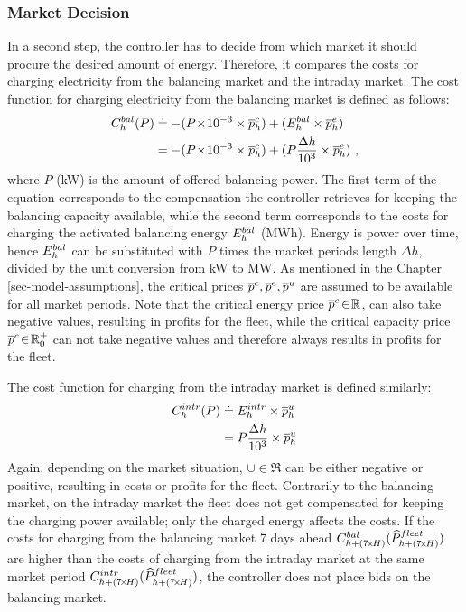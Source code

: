 \documentclass[a4paper, 12pt]{article}
\begin{document}
\subsubsection{Market Decision}
\label{sec:orgabb6f90}
In a second step, the controller has to decide from which market it should
procure the desired amount of energy. Therefore, it compares the costs for
charging electricity from the balancing market and the intraday market. The cost
function for charging electricity from the balancing market is defined as follows:
\begin{equation} \label{eq-cost-balancing}
\begin{split}
    C^{bal}_{h}(P) &\doteq -(P\!\times\!10^{-3} \times \overline p^c_{h}) + (E^{bal}_{h} \times \overline p^e_{h}) \\
    &= -(P\!\times\!10^{-3} \times \overline p^c_{h}) + (P \frac{\Delta h}{10^{3}} \times \overline p^e_{h}) \text{ ,}
\end{split}
\end{equation}
where \(P\) (kW) is the amount of offered balancing power. The first term of the
equation corresponds to the compensation the controller retrieves for keeping
the balancing capacity available, while the second term corresponds to the costs
for charging the activated balancing energy \(E^{bal}_{h}\) (MWh). Energy is power over
time, hence \(E^{bal}_{h}\) can be substituted with \(P\) times the market periods length
\(\Delta{h}\), divided by the unit conversion from kW to MW. As mentioned in the
Chapter \ref{sec-model-assumptions}, the critical prices \(\overline p^c_{}, \overline p^e_{}, \overline p^u_{}\)
are assumed to be available for all market periods. Note that the critical
energy price \(\overline p^e_{}\!\in\!\mathbb{R}\), can also take negative values, resulting in
profits for the fleet, while the critical capacity price \(\overline p^c_{}\!\in\! \mathbb{R}^+_0\)
can not take negative values and therefore always results in profits for the
fleet.

The cost function for charging from the intraday market is defined similarly:
\begin{equation}
\begin{split}
    C^{intr}_{h}(P) &\doteq E^{intr}_{h} \times \overline p^u_{h} \\
    &= P \frac{\Delta h}{10^{3}}\times \overline p^u_{h}
\end{split}
\end{equation}
Again, depending on the market situation, \(\cup{}\!\in\!\Re\) can be either
negative or positive, resulting in costs or profits for the fleet. Contrarily to
the balancing market, on the intraday market the fleet does not get compensated
for keeping the charging power available; only the charged energy affects the
costs. If the costs for charging from the balancing market 7 days ahead
\(C^{bal}_{h+(7\!\times\!H)}(\widehat{P}^{fleet}_{h+(7\!\times\!H)})\) are higher than the costs of
charging from the intraday market at the same market period \(C^{intr}_{h +
(7\!\times\!H)}(\widehat{P}^{fleet}_{h+(7\!\times\!H)})\), the controller does not place bids
on the balancing market.
\end{document}
